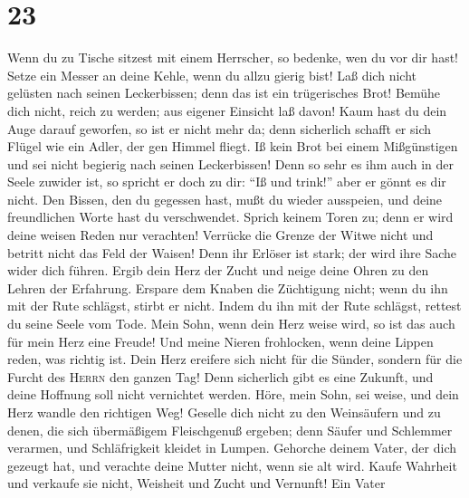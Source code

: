 \hypertarget{section-22}{%
\section{23}\label{section-22}}

 Wenn du zu Tische sitzest mit einem Herrscher, so
bedenke, wen du vor dir hast!  Setze ein Messer an deine
Kehle, wenn du allzu gierig bist!  Laß dich nicht gelüsten
nach seinen Leckerbissen; denn das ist ein trügerisches Brot!
 Bemühe dich nicht, reich zu werden; aus eigener Einsicht
laß davon!  Kaum hast du dein Auge darauf geworfen, so ist
er nicht mehr da; denn sicherlich schafft er sich Flügel wie ein Adler,
der gen Himmel fliegt.  Iß kein Brot bei einem
Mißgünstigen und sei nicht begierig nach seinen Leckerbissen!
 Denn so sehr es ihm auch in der Seele zuwider ist, so
spricht er doch zu dir: ``Iß und trink!'' aber er gönnt es dir nicht.
 Den Bissen, den du gegessen hast, mußt du wieder
ausspeien, und deine freundlichen Worte hast du verschwendet.
 Sprich keinem Toren zu; denn er wird deine weisen Reden
nur verachten!  Verrücke die Grenze der Witwe nicht und
betritt nicht das Feld der Waisen!  Denn ihr Erlöser ist
stark; der wird ihre Sache wider dich führen.  Ergib dein
Herz der Zucht und neige deine Ohren zu den Lehren der Erfahrung.
 Erspare dem Knaben die Züchtigung nicht; wenn du ihn mit
der Rute schlägst, stirbt er nicht.  Indem du ihn mit der
Rute schlägst, rettest du seine Seele vom Tode.  Mein
Sohn, wenn dein Herz weise wird, so ist das auch für mein Herz eine
Freude!  Und meine Nieren frohlocken, wenn deine Lippen
reden, was richtig ist.  Dein Herz ereifere sich nicht
für die Sünder, sondern für die Furcht des \textsc{Herrn} den ganzen
Tag!  Denn sicherlich gibt es eine Zukunft, und deine
Hoffnung soll nicht vernichtet werden.  Höre, mein Sohn,
sei weise, und dein Herz wandle den richtigen Weg! 
Geselle dich nicht zu den Weinsäufern und zu denen, die sich übermäßigem
Fleischgenuß ergeben;  denn Säufer und Schlemmer
verarmen, und Schläfrigkeit kleidet in Lumpen.  Gehorche
deinem Vater, der dich gezeugt hat, und verachte deine Mutter nicht,
wenn sie alt wird.  Kaufe Wahrheit und verkaufe sie
nicht, Weisheit und Zucht und Vernunft!  Ein Vater
